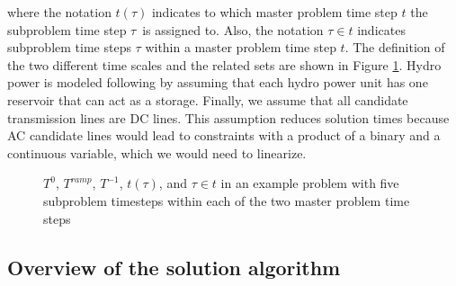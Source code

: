 \documentclass[final]{IEEEtran}
\begin{document}
where the notation $t(\tau)$ indicates to which master problem time step $t$ the subproblem time step $\tau$ is assigned to. Also, the notation $\tau \in t$ indicates subproblem time steps $\tau$ within a master problem time step $t$. The definition of the two different time scales and the related sets are shown in Figure \ref{fig_time_scales}. Hydro power is modeled following \cite{Debia} by assuming that each hydro power unit has one reservoir that can act as a storage. Finally, we assume that all candidate transmission lines are DC lines. This assumption reduces solution times because AC candidate lines would lead to constraints with a product of a binary and a continuous variable, which we would need to linearize.

\begin{figure}[htpb]
	\caption{$T^0$, $T^{ramp}$, $T^{-1}$, $t(\tau)$, and $\tau \in t$ in an example problem with five subproblem timesteps within each of the two master problem time steps}
	\label{fig_time_scales}
	\end{figure}

\subsection{Overview of the solution algorithm}
\end{document}
